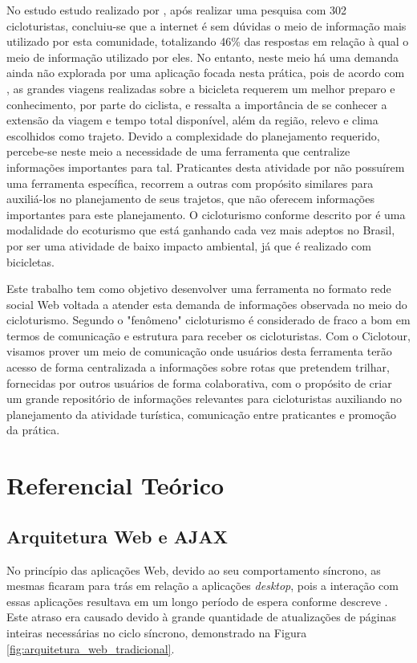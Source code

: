 No estudo estudo realizado por \cite{perfilCicloturista}, após realizar uma pesquisa com 302 cicloturistas, concluiu-se que a internet é sem dúvidas 
o meio de informação mais utilizado por esta comunidade, totalizando 46\% das respostas em relação à qual o meio de informação utilizado por eles.
No entanto, neste meio há uma demanda ainda não explorada por uma aplicação focada nesta prática, pois de acordo com \cite{cicloturismo02}, 
as grandes viagens realizadas sobre a bicicleta requerem um melhor preparo e conhecimento, por parte do ciclista, e ressalta a importância de se 
conhecer a extensão da viagem e tempo total disponível, além da região, relevo e clima escolhidos como trajeto. Devido a complexidade do planejamento
requerido, percebe-se neste meio a necessidade de uma ferramenta que centralize informações importantes para tal. Praticantes desta atividade por não 
possuírem uma ferramenta específica, recorrem a outras com propósito similares para auxiliá-los no planejamento de seus trajetos, que não oferecem 
informações importantes para este planejamento. O cicloturismo conforme descrito por \cite{cicloturismo01} é uma modalidade do ecoturismo que está 
ganhando cada vez mais adeptos no Brasil, por ser uma atividade de baixo impacto ambiental, já que é realizado com bicicletas.

Este trabalho tem como objetivo desenvolver uma ferramenta no formato rede social Web voltada a atender esta demanda de informações observada 
no meio do cicloturismo. Segundo \cite{perfilCicloturista} o  "fenômeno" cicloturismo é considerado de fraco a bom em termos de comunicação 
e estrutura para receber os cicloturistas. Com o Ciclotour, visamos prover um meio de comunicação onde usuários desta ferramenta terão acesso de 
forma centralizada a informações sobre rotas que pretendem trilhar, fornecidas por outros usuários de forma colaborativa, com o propósito 
de criar um grande repositório de informações relevantes para cicloturistas auxiliando no planejamento da atividade turística, comunicação entre 
praticantes e promoção da prática.

\section{\esp Referencial Teórico}
\subsection{Arquitetura Web e AJAX}
No princípio das aplicações Web, devido ao seu comportamento síncrono, as mesmas ficaram para trás em relação a aplicações \textit{desktop}, pois a 
interação com essas aplicações resultava em um longo período de espera conforme descreve \cite{deitelAjax}. Este atraso era causado devido à grande 
quantidade de atualizações de páginas inteiras necessárias no ciclo síncrono, demonstrado na Figura \ref{fig:arquitetura_web_tradicional}. 


